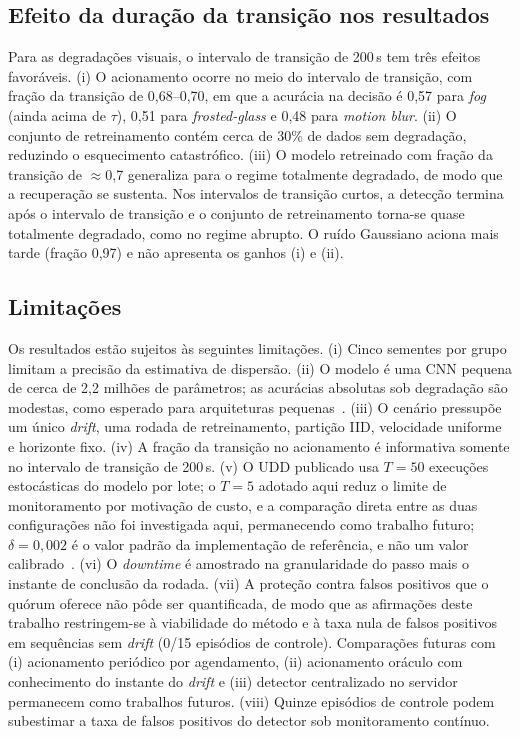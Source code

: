 \documentclass[conference]{IEEEtran}
\begin{document}
\subsection{Efeito da duração da transição nos resultados}
Para as degradações visuais, o intervalo de transição de 200\,s tem três efeitos favoráveis. (i) O acionamento ocorre no meio do intervalo de transição, com fração da transição de 0,68--0,70, em que a acurácia na decisão é 0,57 para \textit{fog} (ainda acima de $\tau$), 0,51 para \textit{frosted-glass} e 0,48 para \textit{motion blur}. (ii) O conjunto de retreinamento contém cerca de 30\% de dados sem degradação, reduzindo o esquecimento catastrófico. (iii) O modelo retreinado com fração da transição de $\approx$0,7 generaliza para o regime totalmente degradado, de modo que a recuperação se sustenta. Nos intervalos de transição curtos, a detecção termina após o intervalo de transição e o conjunto de retreinamento torna-se quase totalmente degradado, como no regime abrupto. O ruído Gaussiano aciona mais tarde (fração 0,97) e não apresenta os ganhos (i) e (ii).

\subsection{Limitações}
Os resultados estão sujeitos às seguintes limitações. (i) Cinco sementes por grupo limitam a precisão da estimativa de dispersão. (ii) O modelo é uma CNN pequena de cerca de 2,2 milhões de parâmetros; as acurácias absolutas sob degradação são modestas, como esperado para arquiteturas pequenas~\cite{hendrycks2019}. (iii) O cenário pressupõe um único \textit{drift}, uma rodada de retreinamento, partição IID, velocidade uniforme e horizonte fixo. (iv) A fração da transição no acionamento é informativa somente no intervalo de transição de 200\,s. (v) O UDD publicado usa $T=50$ execuções estocásticas do modelo por lote; o $T=5$ adotado aqui reduz o limite de monitoramento por motivação de custo, e a comparação direta entre as duas configurações não foi investigada aqui, permanecendo como trabalho futuro; $\delta=0{,}002$ é o valor padrão da implementação de referência, e não um valor calibrado~\cite{baier2023,poenaru2022}. (vi) O \textit{downtime} é amostrado na granularidade do passo mais o instante de conclusão da rodada. (vii) A proteção contra falsos positivos que o quórum oferece não pôde ser quantificada, de modo que as afirmações deste trabalho restringem-se à viabilidade do método e à taxa nula de falsos positivos em sequências sem \textit{drift} (0/15 episódios de controle). Comparações futuras com (i) acionamento periódico por agendamento, (ii) acionamento oráculo com conhecimento do instante do \textit{drift} e (iii) detector centralizado no servidor permanecem como trabalhos futuros. (viii) Quinze episódios de controle podem subestimar a taxa de falsos positivos do detector sob monitoramento contínuo.
\end{document}

